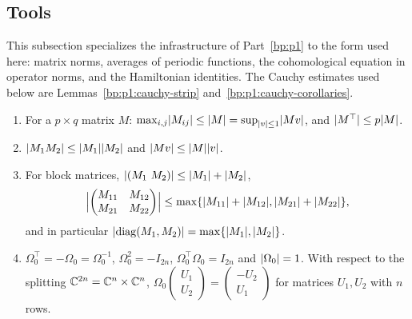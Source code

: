 \subsection{Tools}\label{bp:p2:sec-tools}

This subsection specializes the infrastructure of Part~\ref{bp:p1} to the form used here: matrix
norms, averages of periodic functions, the cohomological equation in operator norms, and the Hamiltonian
identities. The Cauchy estimates used below are Lemmas~\ref{bp:p1:cauchy-strip}
and~\ref{bp:p1:cauchy-corollaries}.

\begin{corollary}\label{bp:p2:matrix}
\begin{enumerate}[label=(\alph*)]
\item For a $p\times q$ matrix $M$: $\max_{i,j}\lvert M_{ij}\rvert\le\lvert M\rvert=\sup_{\lvert v\rvert\le1}\lvert Mv\rvert$, and
  $\lvert M^\top\rvert\le p\lvert M\rvert$.
\item $\lvert M_1M_2\rvert\le\lvert M_1\rvert\lvert M_2\rvert$ and $\lvert Mv\rvert\le\lvert M\rvert\lvert v\rvert$.
\item For block matrices, $\abs{(M_1\ M_2)}\le\abs{M_1}+\abs{M_2}$,
  \[
  \Bigl|\begin{pmatrix}M_{11}&M_{12}\\M_{21}&M_{22}\end{pmatrix}\Bigr|
  \le\max\{\lvert M_{11}\rvert+\lvert M_{12}\rvert,\lvert M_{21}\rvert+\lvert M_{22}\rvert\},
  \]
  and in particular $\lvert \operatorname{diag}(M_1,M_2)\rvert=\max\{\lvert M_1\rvert,\lvert M_2\rvert\}$.
\item $\Omega_0^\top=-\Omega_0=\Omega_0^{-1}$, $\Omega_0^2=-I_{2n}$, $\Omega_0^\top\Omega_0=I_{2n}$ and
  $\lvert \Omega_0\rvert=1$. With respect to the splitting $\mathbb{C}^{2n}=\mathbb{C}^n\times\mathbb{C}^n$,
  $\Omega_0\left(\begin{smallmatrix}U_1\\U_2\end{smallmatrix}\right)
  =\left(\begin{smallmatrix}-U_2\\U_1\end{smallmatrix}\right)$ for matrices $U_1,U_2$ with $n$ rows.
\end{enumerate}
\end{corollary}

